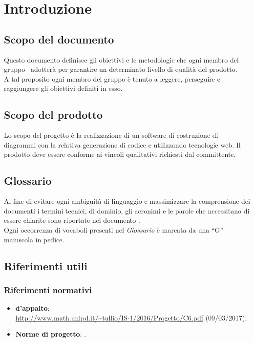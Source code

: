 \documentclass[../PianoDiQualifica.tex]{subfiles}
\begin{document}
	\section{Introduzione}
		\subsection{Scopo del documento} 
			Questo documento definisce gli obiettivi e le metodologie che ogni membro
			del gruppo \kaleidoscode\ adotterà per garantire un determinato livello di
			qualità del prodotto.\\
			A tal proposito ogni membro del gruppo è tenuto a leggere, perseguire e
			raggiungere gli obiettivi definiti in esso.
		\subsection{Scopo del prodotto}
			Lo scopo del progetto è la realizzazione di un software di
			costruzione di diagrammi  con la relativa generazione
			di codice  e  utilizzando tecnologie
			web. Il prodotto deve essere conforme ai vincoli qualitativi
			richiesti dal committente.
		\subsection{Glossario}
			Al fine di evitare ogni ambiguità di linguaggio e massimizzare la
			comprensione dei documenti i termini tecnici, di dominio, gli
			acronimi e le parole che necessitano di essere chiarite sono
			riportate nel documento \glossariov.\\
			Ogni occorrenza di vocaboli presenti nel \textit{Glossario} è
			marcata da una ``G'' maiuscola in pedice.
		\subsection{Riferimenti utili}
			\subsubsection{Riferimenti normativi}
    			\begin{itemize}
    				\item \textbf{ d'appalto}:\\
    				\url{http://www.math.unipd.it/~tullio/IS-1/2016/Progetto/C6.pdf} (09/03/2017);
    				\item \textbf{Norme di progetto}: \normediprogettov.
				\end{itemize}
\end{document}
